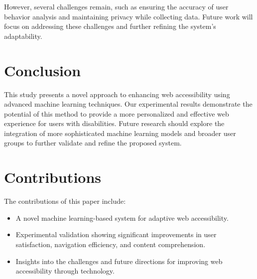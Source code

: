 \documentclass{article}
\begin{document}
However, several challenges remain, such as ensuring the accuracy of user behavior analysis and maintaining privacy while collecting data. Future work will focus on addressing these challenges and further refining the system's adaptability.

\section{Conclusion}
This study presents a novel approach to enhancing web accessibility using advanced machine learning techniques. Our experimental results demonstrate the potential of this method to provide a more personalized and effective web experience for users with disabilities. Future research should explore the integration of more sophisticated machine learning models and broader user groups to further validate and refine the proposed system.

\section{Contributions}
The contributions of this paper include:
\begin{itemize}
    \item A novel machine learning-based system for adaptive web accessibility.
    \item Experimental validation showing significant improvements in user satisfaction, navigation efficiency, and content comprehension.
    \item Insights into the challenges and future directions for improving web accessibility through technology.
\end{itemize}
\end{document}
